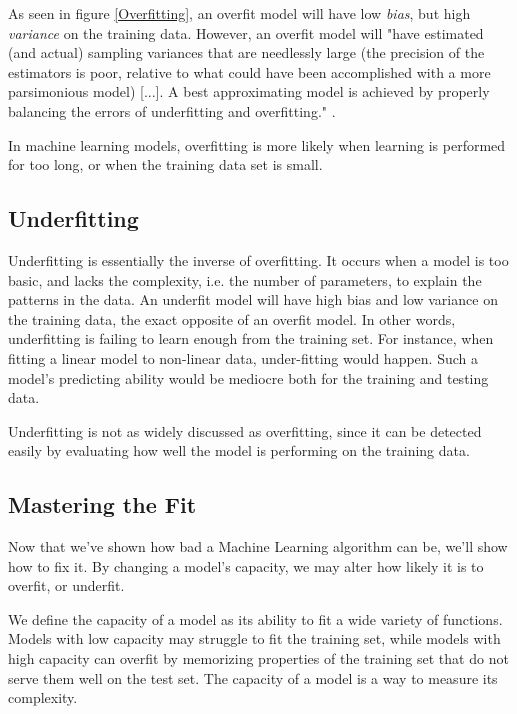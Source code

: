 \documentclass[nobib]{tufte-handout} %
\begin{document}
As seen in figure \ref{Overfitting}, an overfit model will have low \textit{bias}, but high \textit{variance} on the training data. However, an overfit model will "have estimated (and actual) sampling variances that are needlessly large (the precision of the estimators is poor, relative to what could have been accomplished with a more parsimonious model) [...]. A best approximating model is achieved by properly balancing the errors of underfitting and overfitting." \citep{burnham2002model}.
\begin{remark} 
  In machine learning models, overfitting is more likely when learning is performed for too long, or when the training data set is small.
\end{remark}
\subsection{Underfitting}%
  \label{sub:Underfitting}
  Underfitting is essentially the inverse of overfitting. It occurs when a model is too basic, and lacks the complexity, i.e. the number of parameters, to explain the patterns in the data. An underfit model will have high bias and low variance on the training data, the exact opposite of an overfit model. In other words, underfitting is failing to learn enough from the training set. For instance, when fitting a linear model to non-linear data, under-fitting would happen. Such a model's predicting ability would be mediocre both for the training and testing data.

  Underfitting is not as widely discussed as overfitting, since it can be detected easily by evaluating how well the model is performing on the training data. 

 \subsection{Mastering the Fit}%
  \label{sub:Mastering the Fit}
  Now that we've shown how bad a Machine Learning algorithm can be, we'll show how to fix it. By changing a model's capacity, we may alter how likely it is to overfit, or underfit. 
  \begin{definition}[Capacity]
   We define the capacity of a model as its ability to fit a wide variety of
functions. Models with low capacity may struggle to fit the training set, while models
with high capacity can overfit by memorizing properties of the training set that do
not serve them well on the test set. The capacity of a model is a way to measure its complexity.
  \end{definition}
\end{document}
